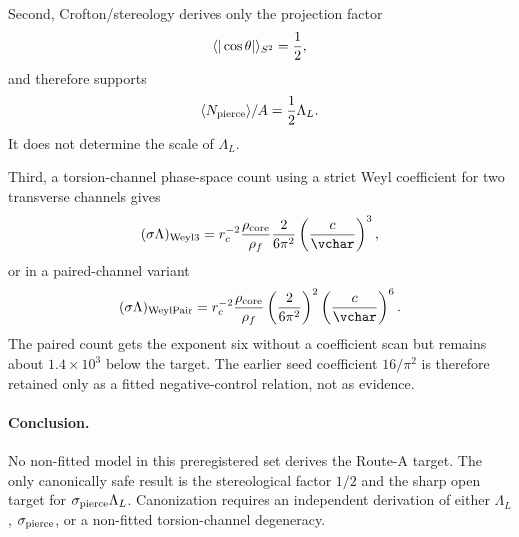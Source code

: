 Second, Crofton/stereology derives only the projection factor
\begin{equation}
  \langle |\cos\theta|\rangle_{S^2}={1\over2},
\end{equation}
and therefore supports
\begin{equation}
  \langle N_{\rm pierce}\rangle/A={1\over2}\Lambda_L.
\end{equation}
It does not determine the scale of $\Lambda_L$.

Third, a torsion-channel phase-space count using a strict Weyl coefficient for
two transverse channels gives
\begin{equation}
  (\sigma\Lambda)_{\rm Weyl3}
  =r_c^{-2}{\rho_{\rm core}\over\rho_f}{2\over6\pi^2}
   \left({c\over\vchar}\right)^3,
\end{equation}
or in a paired-channel variant
\begin{equation}
  (\sigma\Lambda)_{\rm WeylPair}
  =r_c^{-2}{\rho_{\rm core}\over\rho_f}
   \left({2\over6\pi^2}\right)^2
   \left({c\over\vchar}\right)^6.
\end{equation}
The paired count gets the exponent six without a coefficient scan but remains
about $1.4\times10^3$ below the target.  The earlier seed coefficient
$16/\pi^2$ is therefore retained only as a fitted negative-control relation,
not as evidence.

\paragraph{Conclusion.}
No non-fitted model in this preregistered set derives the Route-A target.  The
only canonically safe result is the stereological factor $1/2$ and the sharp
open target for $\sigma_{\rm pierce}\Lambda_L$.  Canonization requires an
independent derivation of either $\Lambda_L$, $\sigma_{\rm pierce}$, or a
non-fitted torsion-channel degeneracy.
